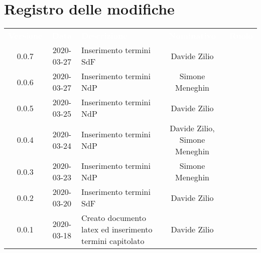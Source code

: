 \section*{Registro delle modifiche}
{
	\centering
	\begin{longtable}{ c c  C{4cm}  c  c }
		\textcolor{white}{\textbf{Versione}} & \textcolor{white}{\textbf{Data}} & \textcolor{white}{\textbf{Descrizione}} & \textcolor{white}{\textbf{Nominativo}} & \textcolor{white}{\textbf{Ruolo}}\\
		0.0.7 & 2020-03-27 & Inserimento termini SdF & Davide Zilio &\reda{}\\
		0.0.6 & 2020-03-27 & Inserimento termini NdP & Simone Meneghin &\reda{}\\
		0.0.5 & 2020-03-25 & Inserimento termini NdP & Davide Zilio &\reda{}\\
		0.0.4 & 2020-03-24 & Inserimento termini NdP & Davide Zilio, Simone Meneghin &\reda{}\\
		
		0.0.3 & 2020-03-23 & Inserimento termini NdP & Simone Meneghin & \reda{}\\
		
		0.0.2 & 2020-03-20 & Inserimento termini SdF& Davide Zilio &\reda{}\\
		
		0.0.1 & 2020-03-18 & Creato documento latex ed inserimento termini capitolato & Davide Zilio &\reda{}\\		
		
	\end{longtable}

}